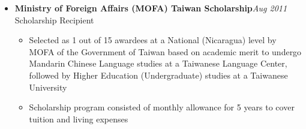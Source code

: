 \begin{itemize}[leftmargin=0pt, label={}]
\item{
{\sectionheading\large{\textbf{Ministry of Foreign Affairs (MOFA) Taiwan Scholarship}}}\hfill {\sectionheading\small{\textit{Aug 2011}}}\\
{\sectionheading\small{Scholarship Recipient}}\hfill

    \vspace{-6pt}
    \begin{itemize}[label=\textbullet, leftmargin=*, noitemsep]%
        \item{Selected as 1 out of 15 awardees at a National (Nicaragua) level by MOFA of the Government of Taiwan based on academic merit to undergo Mandarin Chinese Language studies at a Taiwanese Language Center, followed by Higher Education (Undergraduate) studies at a Taiwanese University}
        \item{Scholarship program consisted of monthly allowance for 5 years to cover tuition and living expenses}
    \end{itemize}
}
\end{itemize}
